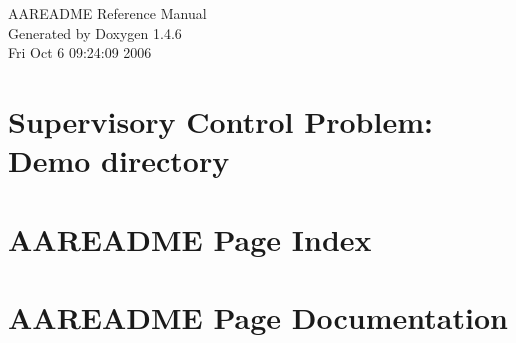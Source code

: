\documentclass[a4paper]{book}
\begin{document}
\begin{titlepage}
\vspace*{7cm}
\begin{center}
{\Large AAREADME Reference Manual}\\
\vspace*{1cm}
{\large Generated by Doxygen 1.4.6}\\
\vspace*{0.5cm}
{\small Fri Oct 6 09:24:09 2006}\\
\end{center}
\end{titlepage}
\clearemptydoublepage
{}
\tableofcontents
\clearemptydoublepage
{}
\chapter{Supervisory Control Problem: Demo directory }
\label{index}
\chapter{AAREADME Page Index}

\chapter{AAREADME Page Documentation}

\printindex
\end{document}
